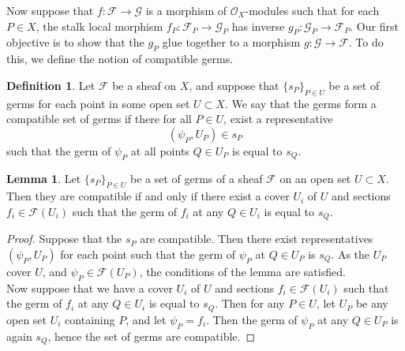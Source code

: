 \documentclass{article}
\theoremstyle{definition}
\newtheorem{definition}[theorem]{Definition}
\newtheorem{lemma}[theorem]{Lemma}
\begin{document}
Now suppose that $f : \mathcal{F} \to \mathcal{G}$ is a morphism of
$\mathcal{O}_X$-modules such that for each $P \in X$, the stalk local morphism
$f_P : \mathcal{F}_P \to \mathcal{G}_P$ has inverse $g_P : \mathcal{G}_P \to
\mathcal{F}_P$. Our first objective is to show that the $g_P$ glue together to
a morphism $g : \mathcal{G} \to \mathcal{F}$. To do this, we define the notion
of compatible germs.

\begin{definition}
	Let $\mathcal{F}$ be a sheaf on $X$, and suppose that $\{s_P\}_{P \in U}$
	be a set of germs for each point in some open set $U \subset X$. We say
	that the germs form a compatible set of germs if there for all $P \in U$,
	exist a representative 
	\[
		(\psi_P, U_P)
		\in 
		s_P
	\]
	such that the germ of $\psi_P$ at all points $Q \in U_P$ is equal to $s_Q$. 
\end{definition}

\begin{lemma}
	Let $\{s_P\}_{P \in U}$ be a set of germs of a sheaf $\mathcal{F}$ on an
	open set $U \subset X$. Then they are compatible if and only if there exist
	a cover $U_i$ of $U$ and sections $f_i \in \mathcal{F}(U_i)$ such that 
	the germ of $f_i$ at any $Q \in U_i$ is equal to $s_Q$.
\end{lemma}
\begin{proof}
	Suppose that the $s_P$ are compatible. Then there exist representatives
	$(\psi_P, U_P)$ for each point such that the germ of $\psi_P$ at $Q \in
	U_P$ is $s_Q$. As the $U_P$ cover $U$, and $\psi_P \in \mathcal{F}(U_P)$,
	the conditions of the lemma are satisfied. \\

	Now suppose that we have a cover $U_i$ of $U$ and sections $f_i \in
	\mathcal{F}(U_i)$ such that the germ of $f_i$ at any $Q \in U_i$ is equal
	to $s_Q$. Then for any $P \in U$, let $U_P$ be any open set $U_i$
	containing $P$, and let $\psi_P = f_i$. Then the germ of $\psi_P$ at any $Q
	\in U_P$ is again $s_Q$, hence the set of germs are compatible.
\end{proof}
\end{document}
